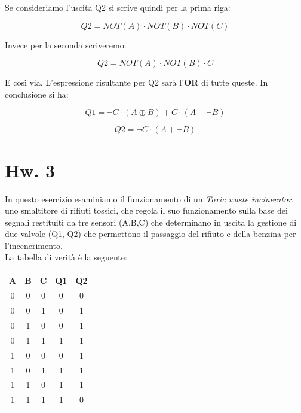 \documentclass[journal, a4paper]{IEEEtran}
\begin{document}
Se consideriamo l'uscita Q2 si scrive quindi per la prima riga:

\begin{equation}
Q2 = NOT(A) \cdot NOT(B) \cdot NOT(C)
\end{equation}

Invece per la seconda scriveremo:

\begin{equation}
Q2 = NOT(A) \cdot NOT(B) \cdot C
\end{equation}

E così via. L'espressione risultante per Q2 sarà l'\textbf{OR} di tutte queste. In conclusione si ha:

\begin{equation}
Q1 = \lnot C \cdot (A \oplus B) + C \cdot (A + \lnot B)
\end{equation}

\begin{equation}
Q2 = \lnot C \cdot (A + \lnot B)
\end{equation}

\section{Hw. 3}
In questo esercizio esaminiamo il funzionamento di un \textit{Toxic waste incinerator}, uno smaltitore di rifiuti tossici, che regola il suo funzionamento sulla base dei segnali restituiti da tre sensori (A,B,C) che determinano in uscita la gestione di due valvole (Q1, Q2) che permettono il passaggio del rifiuto e della benzina per l'incenerimento.\\
La tabella di verità è la seguente:\\

\begin{table}[h]
\centering
\begin{tabular}{c|c|c||c|c}
\hline \textbf{A} & \textbf{B} & \textbf{C} & \textbf{Q1} & \textbf{Q2} \\ 
\hline 0 & 0 & 0 & 0 & 0 \\ 
\hline 0 & 0 & 1 & 0 & 1 \\ 
\hline 0 & 1 & 0 & 0 & 1 \\ 
\hline 0 & 1 & 1 & 1 & 1 \\ 
\hline 1 & 0 & 0 & 0 & 1 \\ 
\hline 1 & 0 & 1 & 1 & 1 \\ 
\hline 1 & 1 & 0 & 1 & 1 \\ 
\hline 1 & 1 & 1 & 1 & 0 \\ 
\hline
\end{tabular} 
\end{table}
\end{document}
